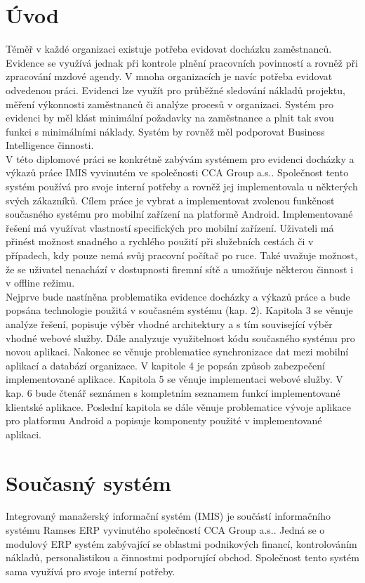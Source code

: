 \documentclass{diplomka}
\begin{document}
\chapter{Úvod}
Téměř v každé organizaci existuje potřeba evidovat docházku zaměstnanců. Evidence se využívá jednak při kontrole plnění pracovních povinností a rovněž při zpracování mzdové agendy. V mnoha organizacích je navíc potřeba evidovat odvedenou práci. Evidenci lze využít pro průběžné sledování nákladů projektu, měření výkonnosti zaměstnanců či analýze procesů v organizaci. Systém pro evidenci by měl klást minimální požadavky na zaměstnance a plnit tak svou funkci s minimálními náklady. Systém by rovněž měl podporovat Business Intelligence činnosti.\\ \indent
V této diplomové práci se konkrétně zabývám systémem pro evidenci docházky a výkazů práce IMIS vyvinutém ve společnosti CCA Group a.s.. Společnost tento systém používá pro svoje interní potřeby a rovněž jej implementovala u některých svých zákazníků. Cílem práce je vybrat a implementovat zvolenou funkčnost současného systému pro mobilní zařízení na platformě Android. Implementované řešení má využívat vlastností specifických pro mobilní zařízení. Uživateli má přinést možnost snadného a rychlého použití při služebních cestách či v případech, kdy pouze nemá svůj pracovní počítač po ruce. Také uvažuje možnost, že se uživatel nenachází v dostupnosti firemní sítě a umožňuje některou činnost i v offline režimu.\\ \indent
Nejprve bude nastíněna problematika evidence docházky a výkazů práce a bude popsána technologie použitá v současném systému (kap. 2). Kapitola 3 se věnuje analýze řešení, popisuje výběr vhodné architektury a s tím související výběr vhodné webové služby. Dále analyzuje využitelnost kódu současného systému pro novou aplikaci. Nakonec se věnuje problematice synchronizace dat mezi mobilní aplikací a databází organizace. V kapitole 4 je popsán způsob zabezpečení implementované aplikace. Kapitola 5 se věnuje implementaci webové služby. V kap. 6 bude čtenář seznámen s kompletním seznamem funkcí implementované klientské aplikace. Poslední kapitola se dále věnuje problematice vývoje aplikace pro platformu Android a popisuje komponenty použité v implementované aplikaci.
\chapter{Současný systém}
Integrovaný manažerský informační systém (IMIS) je součástí informačního systému Ramses ERP vyvinutého společností CCA Group a.s.. Jedná se o modulový ERP systém zabývající se oblastmi podnikových financí, kontrolováním nákladů, personalistikou a činnostmi podporující obchod. Společnost tento systém sama využívá pro svoje interní potřeby.
\end{document}
